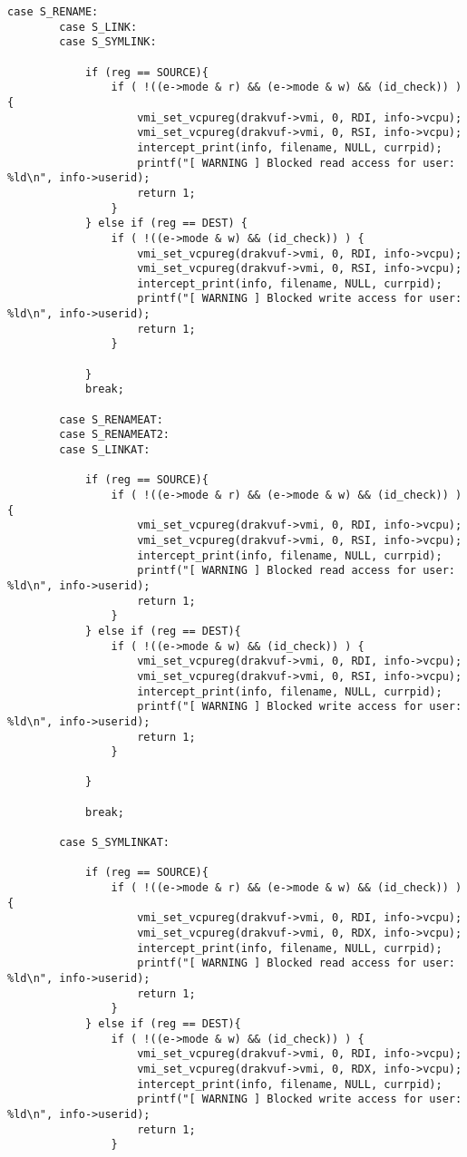{\begin{lstlisting}[style=CStyle]
		case S_RENAME:
		case S_LINK:
		case S_SYMLINK:
		
			if (reg == SOURCE){
				if ( !((e->mode & r) && (e->mode & w) && (id_check)) ) {
					vmi_set_vcpureg(drakvuf->vmi, 0, RDI, info->vcpu);
					vmi_set_vcpureg(drakvuf->vmi, 0, RSI, info->vcpu);
					intercept_print(info, filename, NULL, currpid);
					printf("[ WARNING ] Blocked read access for user: %ld\n", info->userid);
					return 1;
				}
			} else if (reg == DEST) {
				if ( !((e->mode & w) && (id_check)) ) {
					vmi_set_vcpureg(drakvuf->vmi, 0, RDI, info->vcpu);
					vmi_set_vcpureg(drakvuf->vmi, 0, RSI, info->vcpu);
					intercept_print(info, filename, NULL, currpid);
					printf("[ WARNING ] Blocked write access for user: %ld\n", info->userid);
					return 1;
				} 
			
			}
			break;
		
		case S_RENAMEAT:	
		case S_RENAMEAT2:
		case S_LINKAT:
		
			if (reg == SOURCE){
				if ( !((e->mode & r) && (e->mode & w) && (id_check)) ) {
					vmi_set_vcpureg(drakvuf->vmi, 0, RDI, info->vcpu);
					vmi_set_vcpureg(drakvuf->vmi, 0, RSI, info->vcpu);
					intercept_print(info, filename, NULL, currpid);
					printf("[ WARNING ] Blocked read access for user: %ld\n", info->userid);
					return 1;
				}
			} else if (reg == DEST){
				if ( !((e->mode & w) && (id_check)) ) {
					vmi_set_vcpureg(drakvuf->vmi, 0, RDI, info->vcpu);
					vmi_set_vcpureg(drakvuf->vmi, 0, RSI, info->vcpu);
					intercept_print(info, filename, NULL, currpid);
					printf("[ WARNING ] Blocked write access for user: %ld\n", info->userid);
					return 1;
				} 
			
			}
			
			break;
		
		case S_SYMLINKAT:
		
			if (reg == SOURCE){
				if ( !((e->mode & r) && (e->mode & w) && (id_check)) ) {
					vmi_set_vcpureg(drakvuf->vmi, 0, RDI, info->vcpu);
					vmi_set_vcpureg(drakvuf->vmi, 0, RDX, info->vcpu);
					intercept_print(info, filename, NULL, currpid);
					printf("[ WARNING ] Blocked read access for user: %ld\n", info->userid);
					return 1;
				}
			} else if (reg == DEST){
				if ( !((e->mode & w) && (id_check)) ) {
					vmi_set_vcpureg(drakvuf->vmi, 0, RDI, info->vcpu);
					vmi_set_vcpureg(drakvuf->vmi, 0, RDX, info->vcpu);
					intercept_print(info, filename, NULL, currpid);
					printf("[ WARNING ] Blocked write access for user: %ld\n", info->userid);
					return 1;
				} 
			

\end{lstlisting}}
